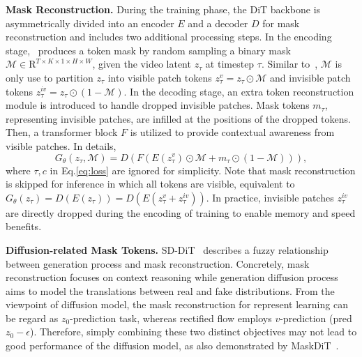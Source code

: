 \noindent\textbf{Mask Reconstruction.} 
During the training phase, the DiT backbone is asymmetrically divided into  an encoder 
$E$ and a decoder $D$ for mask reconstruction and includes two additional processing steps. In the encoding stage, \ourmethod~produces a token mask by random sampling a binary mask $\mathcal{M} \in \mathrm{R}^{T \times K \times 1 \times H \times W}$, given the video latent $z_\tau$ at timestep $\tau$. Similar to~\cite{mdt,sd_dit}, $\mathcal{M}$ is only use to partition $z_\tau$ into visible patch tokens $z_\tau^v=z_\tau \odot \mathcal{M}$ and invisible patch tokens $z_\tau^{iv}=z_\tau \odot (1-\mathcal{M})$. 
In the decoding stage, an extra token reconstruction module is introduced to handle dropped invisible patches. Mask tokens $m_\tau$, representing invisible patches, are infilled at the positions of the dropped tokens. Then, a transformer block $F$ is utilized to provide contextual awareness from visible patches. In details,
\begin{equation}
    G_\theta(z_\tau,\mathcal{M}) = D(F(E(z_\tau^v)\odot \mathcal{M}+m_\tau \odot (1-\mathcal{M}))),
\label{eq:img_diff}
\end{equation}
where $\tau,c$ in Eq.\eqref{eq:loss} are ignored for simplicity. Note that mask reconstruction is skipped for inference in which all tokens are visible, equivalent to $G_\theta(z_\tau) = D(E(z_\tau)) = D(E(z_\tau^v + z_\tau^{iv}))$. In practice, invisible patches $z_\tau^{iv}$ are directly dropped during the encoding of training to enable memory and speed benefits.



\noindent\textbf{Diffusion-related Mask Tokens.}
SD-DiT~\cite{sd_dit} describes a fuzzy relationship between generation process and mask reconstruction. Concretely, mask reconstruction focuses on context reasoning while generation diffusion process aims to model the translations between real and fake distributions.
From the viewpoint of diffusion model, the mask reconstruction for represent learning can be regard as $z_0$-prediction task, whereas rectified flow employs $v$-prediction (pred $z_0-\epsilon$). Therefore, simply combining these two distinct objectives may not lead to good performance of the diffusion model, as also demonstrated by MaskDiT~\cite{maskdit}.

